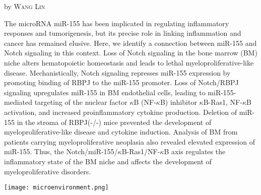 \documentclass[10pt,a4paper]{article}
\newcommand{\NewsItem}[1]{ %
\usefont{T1}{fvs}{n}{n} %
\vspace{24pt}\large #1\vspace{3pt} %
\par \normalsize \normalfont}
\newcommand{\NewsAuthor}[1]{ %
\hfill by \textsc{#1} \vspace{20pt} %
\par \normalfont}
\begin{document}
\begin{multicols}{2}
\NewsItem{{\color{hugoteal}{Notch-Dependent Repression of miR-155 in the Bone Marrow Niche Regulates Hematopoiesis in an NF-$\kappa$B-Dependent Manner}}}
\NewsAuthor{Wang Lin}

The microRNA miR-155 has been implicated in regulating inflammatory responses and tumorigenesis, but its precise role in linking inflammation and cancer has remained elusive.
Here, we identify a connection between miR-155 and Notch signaling in this context.
Loss of Notch signaling in the bone marrow (BM) niche alters hematopoietic homeostasis and leads to lethal myeloproliferative-like disease.
Mechanistically, Notch signaling represses miR-155 expression by promoting binding of RBPJ to the miR-155 promoter.
Loss of Notch/RBPJ signaling upregulates miR-155 in BM endothelial cells, leading to miR-155-mediated targeting of the nuclear factor $\kappa$B (NF-$\kappa$B) inhibitor $\kappa$B-Ras1, NF-$\kappa$B activation, and increased proinflammatory cytokine production.
Deletion of miR-155 in the stroma of RBPJ(-/-) mice prevented the development of myeloproliferative-like disease and cytokine induction.
Analysis of BM from patients carrying myeloproliferative neoplasia also revealed elevated expression of miR-155.
Thus, the Notch/miR-155/$\kappa$B-Ras1/NF-$\kappa$B axis regulates the inflammatory state of the BM niche and affects the development of myeloproliferative disorders.\cite{wang2014notch}


\begin{center}
\texttt{[image: microenvironment.png]} %
\end{center}



\begin{quotation}


\end{quotation}
\end{multicols}
\end{document}
